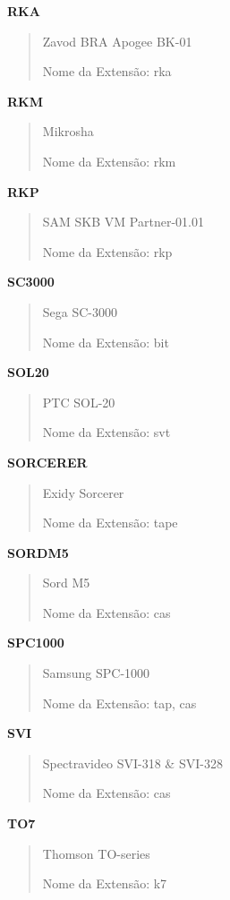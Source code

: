 \documentclass[letterpaper,10pt,brazil]{sphinxmanual}
\begin{document}
\textbf{RKA}
\begin{quote}

Zavod BRA Apogee BK-01

Nome da Extensão: rka
\end{quote}

\textbf{RKM}
\begin{quote}

Mikrosha

Nome da Extensão: rkm
\end{quote}

\textbf{RKP}
\begin{quote}

SAM SKB VM Partner-01.01

Nome da Extensão: rkp
\end{quote}

\textbf{SC3000}
\begin{quote}

Sega SC-3000

Nome da Extensão: bit
\end{quote}

\textbf{SOL20}
\begin{quote}

PTC SOL-20

Nome da Extensão: svt
\end{quote}

\textbf{SORCERER}
\begin{quote}

Exidy Sorcerer

Nome da Extensão: tape
\end{quote}

\textbf{SORDM5}
\begin{quote}

Sord M5

Nome da Extensão: cas
\end{quote}

\textbf{SPC1000}
\begin{quote}

Samsung SPC-1000

Nome da Extensão: tap, cas
\end{quote}

\textbf{SVI}
\begin{quote}

Spectravideo SVI-318 \& SVI-328

Nome da Extensão: cas
\end{quote}

\textbf{TO7}
\begin{quote}

Thomson TO-series

Nome da Extensão: k7
\end{quote}
\end{document}
